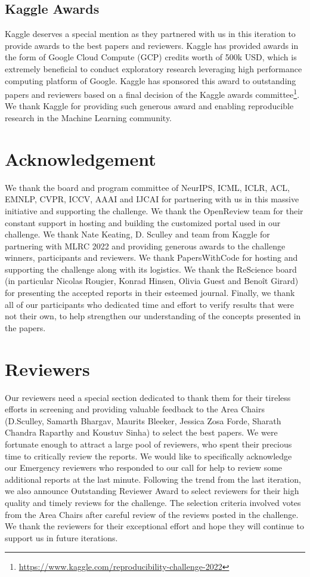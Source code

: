 \subsection{Kaggle Awards}

Kaggle deserves a special mention as they partnered with us in this iteration to provide awards to the best papers and reviewers. Kaggle has provided awards in the form of Google Cloud Compute (GCP) credits worth of 500k USD, which is extremely beneficial to conduct exploratory research leveraging high performance computing platform of Google. Kaggle has sponsored this award to  outstanding papers and reviewers based on a final decision of the Kaggle awards committee\footnote{\url{https://www.kaggle.com/reproducibility-challenge-2022}}. We thank Kaggle for providing such generous award and enabling reproducible research in the Machine Learning community.

\section{Acknowledgement}

We thank the board and program committee of NeurIPS, ICML, ICLR, ACL, EMNLP, CVPR, ICCV, AAAI and IJCAI for partnering with us in this massive initiative and supporting the challenge. We thank the OpenReview team for their constant support in hosting and building the customized portal used in our challenge.
We thank Nate Keating, D. Sculley and team from Kaggle for partnering with MLRC 2022 and providing generous awards to the challenge winners, participants and reviewers.
We thank PapersWithCode for hosting and supporting the challenge along with its logistics. We thank the ReScience board (in particular Nicolas Rougier, Konrad Hinsen, Olivia Guest and Benoît Girard)
for presenting the accepted reports in their esteemed journal. Finally, we thank all of our participants who dedicated time and effort to verify results that were not their own, to help strengthen our understanding of the concepts presented in the papers.

\section{Reviewers}

Our reviewers need a special section dedicated to thank them for their tireless efforts in screening and providing valuable feedback to the Area Chairs (D.Sculley, Samarth Bhargav, Maurits Bleeker, Jessica Zosa Forde, Sharath Chandra Raparthy and Koustuv Sinha) to select the best papers. We were fortunate enough to attract a large pool of reviewers, who spent their precious time to critically review the reports. We would like to specifically acknowledge our Emergency reviewers who responded to our call for help to review some additional reports at the last minute. Following the trend from the last iteration, we also announce Outstanding Reviewer Award to select reviewers for their high quality and timely reviews for the challenge. The selection criteria involved votes from the Area Chairs after careful review of the reviews posted in the challenge. We thank the reviewers for their exceptional effort and hope they will continue to support us in future iterations.

